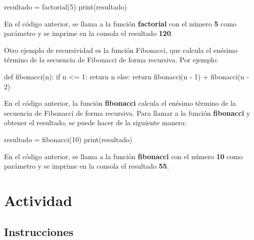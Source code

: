 \documentclass[
  a4paper,
  DIV=11,
  numbers=noendperiod,
  onepage,
  openany]{scrreprt}
\newenvironment{Shaded}{\begin{snugshade}}{\end{snugshade}}
\newcommand{\BuiltInTok}[1]{\textcolor[rgb]{0.00,0.23,0.31}{#1}}
\newcommand{\ControlFlowTok}[1]{\textcolor[rgb]{0.00,0.23,0.31}{#1}}
\newcommand{\DecValTok}[1]{\textcolor[rgb]{0.68,0.00,0.00}{#1}}
\newcommand{\KeywordTok}[1]{\textcolor[rgb]{0.00,0.23,0.31}{#1}}
\newcommand{\NormalTok}[1]{\textcolor[rgb]{0.00,0.23,0.31}{#1}}
\newcommand{\OperatorTok}[1]{\textcolor[rgb]{0.37,0.37,0.37}{#1}}
\begin{document}
\begin{Shaded}
\begin{Highlighting}[]
\NormalTok{resultado }\OperatorTok{=}\NormalTok{ factorial(}\DecValTok{5}\NormalTok{)}
\BuiltInTok{print}\NormalTok{(resultado)}
\end{Highlighting}
\end{Shaded}

En el código anterior, se llama a la función \textbf{factorial} con el
número \textbf{5} como parámetro y se imprime en la consola el resultado
\textbf{120}.

Otro ejemplo de recursividad es la función Fibonacci, que calcula el
enésimo término de la secuencia de Fibonacci de forma recursiva. Por
ejemplo:

\begin{Shaded}
\begin{Highlighting}[]
\KeywordTok{def}\NormalTok{ fibonacci(n):}
    \ControlFlowTok{if}\NormalTok{ n }\OperatorTok{\textless{}=} \DecValTok{1}\NormalTok{:}
        \ControlFlowTok{return}\NormalTok{ n}
    \ControlFlowTok{else}\NormalTok{:}
        \ControlFlowTok{return}\NormalTok{ fibonacci(n }\OperatorTok{{-}} \DecValTok{1}\NormalTok{) }\OperatorTok{+}\NormalTok{ fibonacci(n }\OperatorTok{{-}} \DecValTok{2}\NormalTok{)}
\end{Highlighting}
\end{Shaded}

En el código anterior, la función \textbf{fibonacci} calcula el enésimo
término de la secuencia de Fibonacci de forma recursiva. Para llamar a
la función \textbf{fibonacci} y obtener el resultado, se puede hacer de
la siguiente manera:

\begin{Shaded}
\begin{Highlighting}[]
\NormalTok{resultado }\OperatorTok{=}\NormalTok{ fibonacci(}\DecValTok{10}\NormalTok{)}
\BuiltInTok{print}\NormalTok{(resultado)}
\end{Highlighting}
\end{Shaded}

En el código anterior, se llama a la función \textbf{fibonacci} con el
número \textbf{10} como parámetro y se imprime en la consola el
resultado \textbf{55}.

\chapter{Actividad}\label{actividad-3}

\section{Instrucciones}\label{instrucciones-3}
\end{document}
